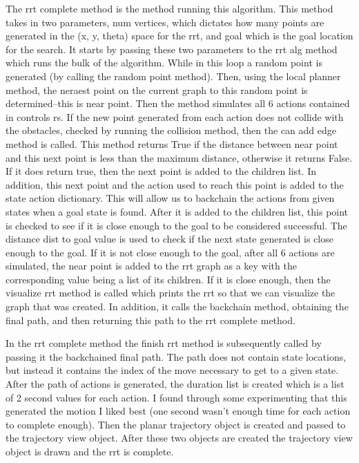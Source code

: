 \documentclass{article}
\begin{document}
The rrt complete method is the method running this algorithm. This method takes in two parameters, num vertices, which dictates how many points are generated in the (x, y, theta) space for the rrt, and goal which is the goal location for the search. It starts by passing these two parameters to the rrt alg method which runs the bulk of the algorithm. While in this loop a random point is generated (by calling the random point method). Then, using the local planner method, the neraest point on the current graph to this random point is determined--this is near point. Then the method simulates all 6 actions contained in controls rs. If the new point generated from each action does not collide with the obstacles, checked by running the collision method, then the can add edge method is called. This method returns True if the distance between near point and this next point is less than the maximum distance, otherwise it returns False. If it does return true, then the next point is added to the children list. In addition, this next point and the action used to reach this point is added to the state action dictionary. This will allow us to backchain the actions from given states when a goal state is found. After it is added to the children list, this point is checked to see if it is close enough to the goal to be considered successful. The distance dist to goal value is used to check if the next state generated is close enough to the goal. If it is not close enough to the goal, after all 6 actions are simulated, the near point is added to the rrt graph as a key with the corresponding value being a list of its children. If it is close enough, then the visualize rrt method is called which prints the rrt so that we can visualize the graph that was created. In addition, it calls the backchain method, obtaining the final path, and then returning this path to the rrt complete method. 

In the rrt complete method the finish rrt method is subsequently called by passing it the backchained final path. The path does not contain state locations, but instead it contains the index of the move necessary to get to a given state. After the path of actions is generated, the duration list is created which is a list of 2 second values for each action. I found through some experimenting that this generated the motion I liked best (one second wasn't enough time for each action to complete enough). Then the planar trajectory object is created and passed to the trajectory view object. After these two objects are created the trajectory view object is drawn and the rrt is complete. 
\end{document}
